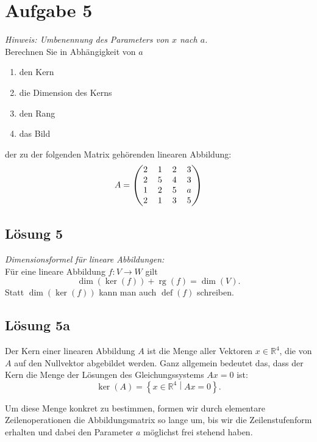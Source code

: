 \documentclass[main.tex]{subfiles}
\begin{document}
\section{Aufgabe 5}
\textit{Hinweis: Umbenennung des Parameters von $x$ nach $a$.}\\
Berechnen Sie in Abhängigkeit von $a$

\begin{enumerate}
    \item den Kern
    \item die Dimension des Kerns
    \item den Rang
    \item das Bild
\end{enumerate}
der zu der folgenden Matrix gehörenden linearen Abbildung:
$$
    \arraycolsep=0.6em
    A = \begin{pmatrix}
        2 & 1 & 2 & 3 \\
        2 & 5 & 4 & 3 \\
        1 & 2 & 5 & a \\
        2 & 1 & 3 & 5
    \end{pmatrix}
$$

\subsection{Lösung 5}
\textit{Dimensionsformel für lineare Abbildungen:}\\
Für eine lineare Abbildung $f: V \to W$ gilt
$$
    \dim (\ker (f)) + \operatorname{rg}(f) = \dim (V).
$$
Statt $\dim (\ker (f))$ kann man auch $\operatorname{def}(f)$ schreiben.

\subsection{Lösung 5a}

Der Kern einer linearen Abbildung $A$ ist die Menge aller Vektoren $x \in \mathbb{R}^4$, die von $A$ auf den Nullvektor abgebildet werden. Ganz allgemein bedeutet das, dass der Kern die Menge der Lösungen des Gleichungssystems $Ax=0$ ist:
$$
    \ker (A) = \left\{ x\in \mathbb{R}^4 \middle| Ax=0 \right\}.
$$

Um diese Menge konkret zu bestimmen, formen wir durch elementare Zeilenoperationen die Abbildungsmatrix so lange um, bis wir die Zeilenstufenform erhalten und dabei den Parameter $a$ möglichst frei stehend haben. 
\end{document}
